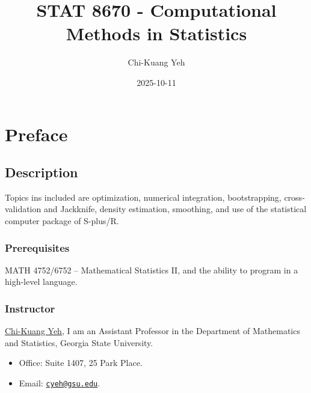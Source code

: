 \documentclass[
  letterpaper,
  DIV=11,
  numbers=noendperiod]{scrreprt}
\title{STAT 8670 - Computational Methods in Statistics}
\author{Chi-Kuang Yeh}
\date{2025-10-11}
\providecommand{\tightlist}{%
  \setlength{\itemsep}{0pt}\setlength{\parskip}{0pt}}
\renewcommand*\contentsname{Table of contents}
\newcommand\contentsname{Table of contents}
\begin{document}
\maketitle

\renewcommand*\contentsname{Table of contents}
{
\hypersetup{linkcolor=}
\setcounter{tocdepth}{2}
\tableofcontents
}


\chapter*{Preface}\label{preface}


\section*{Description}\label{description}


Topics ins included are optimization, numerical integration,
bootstrapping, cross-validation and Jackknife, density estimation,
smoothing, and use of the statistical computer package of S-plus/R.

\subsection*{Prerequisites}\label{prerequisites}

MATH 4752/6752 -- Mathematical Statistics II, and the ability to program
in a high-level language.

\subsection*{Instructor}\label{instructor}

\href{https://chikuang.github.io/}{Chi-Kuang Yeh}, I am an Assistant
Professor in the Department of Mathematics and Statistics, Georgia State
University.

\begin{itemize}
\tightlist
\item
  Office: Suite 1407, 25 Park Place.
\item
  Email: \href{mailto:cyeh@gsu.edu}{\nolinkurl{cyeh@gsu.edu}}.
\end{itemize}
\end{document}
